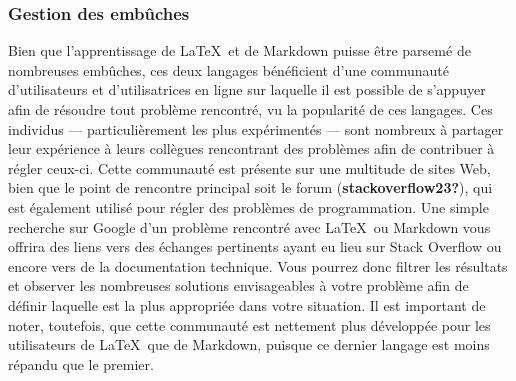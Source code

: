 \documentclass[
  letterpaper,
  DIV=11,
  numbers=noendperiod]{scrreprt}
\begin{document}
\hypertarget{gestion-des-embuxfbches}{%
\subsubsection{Gestion des embûches}\label{gestion-des-embuxfbches}}

Bien que l'apprentissage de \LaTeX~et de Markdown puisse être parsemé de
nombreuses embûches, ces deux langages bénéficient d'une communauté
d'utilisateurs et d'utilisatrices en ligne sur laquelle il est possible
de s'appuyer afin de résoudre tout problème rencontré, vu la popularité
de ces langages. Ces individus --- particulièrement les plus
expérimentés --- sont nombreux à partager leur expérience à leurs
collègues rencontrant des problèmes afin de contribuer à régler ceux-ci.
Cette communauté est présente sur une multitude de sites Web, bien que
le point de rencontre principal soit le forum
(\textbf{stackoverflow23?}), qui est également utilisé pour régler des
problèmes de programmation. Une simple recherche sur Google d'un
problème rencontré avec \LaTeX~ou Markdown vous offrira des liens vers
des échanges pertinents ayant eu lieu sur Stack Overflow ou encore vers
de la documentation technique. Vous pourrez donc filtrer les résultats
et observer les nombreuses solutions envisageables à votre problème afin
de définir laquelle est la plus appropriée dans votre situation. Il est
important de noter, toutefois, que cette communauté est nettement plus
développée pour les utilisateurs de \LaTeX~que de Markdown, puisque ce
dernier langage est moins répandu que le premier.
\end{document}
